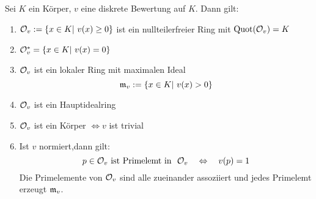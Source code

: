 \begin{sa} \label{17.3}
	Sei $K$ ein Körper, $v$ eine diskrete Bewertung auf $K$. Dann gilt: 
	\begin{enumerate} [label= \alph*)]
		\item $\mathcal{O}_v := \{x \in K| \ v(x) \geq 0\}$ ist ein nullteilerfreier Ring mit $\operatorname{Quot}(\mathcal{O}_v) = K $
		\item $\mathcal{O}_v^{*} = \{ x \in K | \ v(x) =0 \} $
		\item $\mathcal{O}_v$ ist ein lokaler Ring mit maximalen Ideal $$ \mathfrak{m}_v := \{x \in K | \ v(x) > 0\} $$ 
		\item $\mathcal{O}_v$ ist ein Hauptidealring
		\item $\mathcal{O}_v$ ist ein Körper $\Leftrightarrow v$ ist trivial 
		\item Ist $v$ normiert,dann gilt: $$ p \in \mathcal{O}_v \ \text{ist Primelemt in } \ \mathcal{O}_v \quad \Leftrightarrow \quad v(p) =1 $$
		Die Primelemente von $ \mathcal{O}_v $ sind alle zueinander assoziiert und jedes Primelemt erzeugt $\mathfrak{m}_v$.
	\end{enumerate}
\end{sa}
